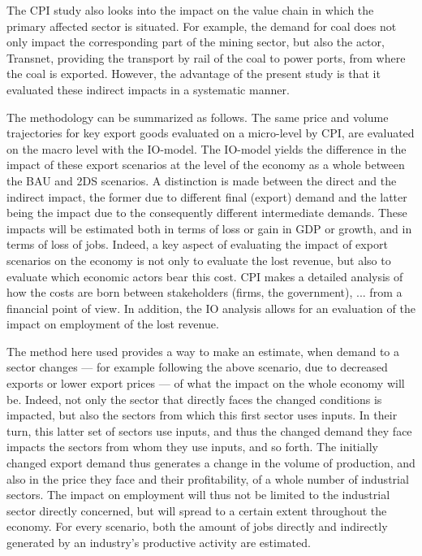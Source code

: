 \documentclass[12pt,english]{article}
\begin{document}
The CPI study also looks into the impact on the value chain in which the primary affected sector is situated. For example, the demand for coal does not only impact the corresponding part of the mining sector, but also the actor, Transnet, providing the transport by rail of the coal to power ports, from where the coal is exported. However, the advantage of the present study is that it evaluated these indirect impacts in a systematic manner.

The methodology can be summarized as follows. The same price and volume trajectories for key export goods %
evaluated on a micro-level by CPI, are evaluated on the macro level with the IO-model. The IO-model yields the difference in the impact of these export scenarios at the level of the economy as a whole between the BAU and 2DS scenarios. A distinction is made between the direct and the indirect impact, the former due to different final (export) demand and the latter being the impact due to the consequently different intermediate demands. These impacts will be estimated both in terms of loss or gain in GDP or growth, and in terms of loss of jobs. Indeed, a key aspect of evaluating the impact of export scenarios on the economy is not only to evaluate the lost revenue, but also to evaluate which economic actors bear this cost. CPI makes a detailed analysis of how the costs are born between stakeholders (firms, the government), ... from a financial point of view. In addition, the IO analysis allows for an evaluation of the impact on employment of the lost revenue. 




The method here used provides a way to make an estimate, when demand to a sector changes --- for example following the above scenario, due to decreased exports or lower export prices --- of what the impact on the whole economy  will be. Indeed, not only the sector that directly faces the changed conditions is impacted, but also the sectors from which this first sector uses inputs. In their turn, this latter set of sectors use inputs, and thus the changed demand they face impacts the sectors from whom they use inputs, and so forth. The initially changed export demand thus generates a change in the volume of production, and also in the price they face and their profitability, of a whole number of industrial sectors. The impact on employment will thus not be limited to the industrial sector directly concerned, but will spread to a certain extent throughout the economy. For every scenario, both the amount of jobs directly and indirectly generated by an industry's productive activity are estimated.
\end{document}
